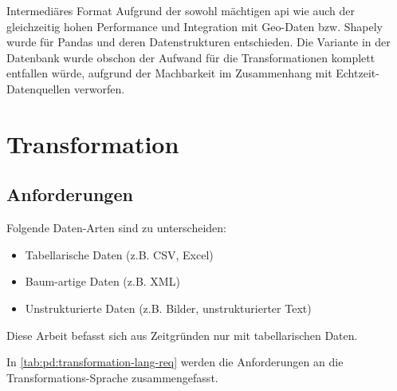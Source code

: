 \begin{decision}[label=dec:pd:format]{Intermediäres Format}
Aufgrund der sowohl mächtigen \acs{api} wie auch der gleichzeitig hohen Performance und Integration mit Geo-Daten bzw. Shapely wurde für Pandas und deren Datenstrukturen entschieden. Die Variante in der Datenbank wurde obschon der Aufwand für die Transformationen komplett entfallen würde, aufgrund der Machbarkeit im Zusammenhang mit Echtzeit-Datenquellen verworfen.
\end{decision}

\section{Transformation}

\subsection{Anforderungen}
Folgende Daten-Arten sind zu unterscheiden:
\begin{itemize}
\item Tabellarische Daten (z.B. CSV, Excel)
\item Baum-artige Daten (z.B. XML)
\item Unstrukturierte Daten (z.B. Bilder, unstrukturierter Text)
\end{itemize}

Diese Arbeit befasst sich aus Zeitgründen nur mit tabellarischen Daten.

In \cref{tab:pd:transformation-lang-req} werden die Anforderungen an die Transformations-Sprache zusammengefasst.


